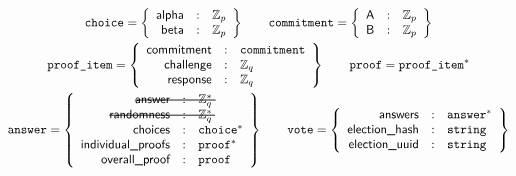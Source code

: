 \documentclass[a4paper]{article}
\newcommand{\Z}{\mathbb{Z}}
\begin{document}
\begin{gather*}
  \texttt{choice}=\left\{
    \begin{array}{rcl}
      \textsf{alpha}&:&\Z_p\\
      \textsf{beta}&:&\Z_p
    \end{array}
  \right\}
  \qquad
  \texttt{commitment}=\left\{
    \begin{array}{rcl}
      \textsf{A}&:&\Z_p\\
      \textsf{B}&:&\Z_p
    \end{array}
  \right\}
  \\
  \texttt{proof\_item}=\left\{
    \begin{array}{rcl}
      \textsf{commitment}&:&\texttt{commitment}\\
      \textsf{challenge}&:&\Z_q\\
      \textsf{response}&:&\Z_q
    \end{array}
  \right\}
  \qquad
  \texttt{proof}=\texttt{proof\_item}^\ast
  \\
  \texttt{answer}=\left\{
    \begin{array}{rcl}
      \makebox[0pt][l]{\rule[0.5ex]{6.5em}{0.7pt}}
      \textsf{answer}&:&\Z_q^\ast\\
      \makebox[0pt][l]{\rule[0.5ex]{8.5em}{0.7pt}}
      \textsf{randomness}&:&\Z_q^\ast\\
      \textsf{choices}&:&\texttt{choice}^\ast\\
      \textsf{individual\_proofs}&:&\texttt{proof}^\ast\\
      \textsf{overall\_proof}&:&\texttt{proof}
    \end{array}
  \right\}
  \qquad
  \texttt{vote}=\left\{
    \begin{array}{rcl}
      \textsf{answers}&:&\texttt{answer}^\ast\\
      \textsf{election\_hash}&:&\texttt{string}\\
      \textsf{election\_uuid}&:&\texttt{string}
    \end{array}
  \right\}
\end{gather*}
\end{document}
